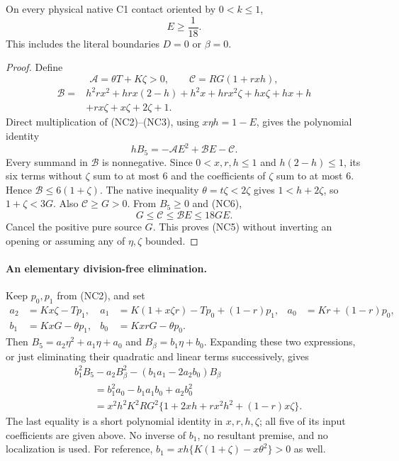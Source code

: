 \begin{lemma}
On every physical native C1 contact oriented by $0<k\le1$,
\[
                         E\ge\frac1{18}.             \tag{NC5}
\]
This includes the literal boundaries $D=0$ or $\beta=0$.
\end{lemma}
\begin{proof}
Define
\[
 \mathcal A=\theta T+K\zeta>0,\qquad
 \mathcal C=RG(1+rxh),
\]
\begin{align*}
 \mathcal B={}&h^2rx^2+hrx(2-h)+h^2x+hrx^2\zeta
             +hx\zeta+hx+h\\
             &+rx\zeta+x\zeta+2\zeta+1.
\end{align*}
Direct multiplication of (NC2)--(NC3), using $x\eta h=1-E$,
gives the polynomial identity
\[
                  hB_5=-\mathcal A E^2+\mathcal B E-\mathcal C.
 \tag{NC6}
\]
Every summand in $\mathcal B$ is nonnegative. Since
$0<x,r,h\le1$ and $h(2-h)\le1$, its six terms without $\zeta$
sum to at most $6$ and the coefficients of $\zeta$ sum to at most
$6$. Hence $\mathcal B\le6(1+\zeta)$. The native inequality
$\theta=t\zeta<2\zeta$ gives $1<h+2\zeta$, so
$1+\zeta<3G$. Also $\mathcal C\ge G>0$. From $B_5\ge0$ and
(NC6),
\[
 G\le\mathcal C\le\mathcal B E\le18GE.
\]
Cancel the positive pure source $G$. This proves (NC5) without
inverting an opening or assuming any of $\eta,\zeta$ bounded.
\end{proof}

\paragraph{An elementary division-free elimination.}
Keep $p_0,p_1$ from (NC2), and set
\begin{align*}
 a_2&=Kx\zeta-Tp_1,&
 a_1&=K(1+x\zeta r)-Tp_0+(1-r)p_1,&
 a_0&=Kr+(1-r)p_0,\\
 b_1&=KxG-\theta p_1,&
 b_0&=KxrG-\theta p_0.
\end{align*}
Then $B_5=a_2\eta^2+a_1\eta+a_0$ and
$B_\beta=b_1\eta+b_0$. Expanding these two expressions, or just
eliminating their quadratic and linear terms successively, gives
\begin{align*}
 &b_1^2B_5-a_2B_\beta^2-(b_1a_1-2a_2b_0)B_\beta\\
 &\qquad=b_1^2a_0-b_1a_1b_0+a_2b_0^2\\
 &\qquad=x^2h^2K^2RG^2
       \{1+2xh+rx^2h^2+(1-r)x\zeta\}.
 \tag{NC7}
\end{align*}
The last equality is a short polynomial identity in $x,r,h,\zeta$;
all five of its input coefficients are given above. No inverse of
$b_1$, no resultant premise, and no localization is used. For reference,
$b_1=xh\{K(1+\zeta)-x\theta^2\}>0$ as well.

